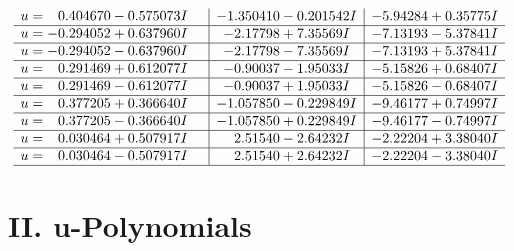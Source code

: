\documentclass[1p]{elsarticle_modified}
\theoremstyle{definition}
\begin{document}
$$\begin{array}{c|c|c}
\begin{aligned}
u &= \phantom{-}0.404670 - 0.575073 I\end{aligned}
 & -1.350410 - 0.201542 I & -5.94284 + 0.35775 I \\ \hline\begin{aligned}
u &= -0.294052 + 0.637960 I\end{aligned}
 & -2.17798 + 7.35569 I & -7.13193 - 5.37841 I \\ \hline\begin{aligned}
u &= -0.294052 - 0.637960 I\end{aligned}
 & -2.17798 - 7.35569 I & -7.13193 + 5.37841 I \\ \hline\begin{aligned}
u &= \phantom{-}0.291469 + 0.612077 I\end{aligned}
 & -0.90037 - 1.95033 I & -5.15826 + 0.68407 I \\ \hline\begin{aligned}
u &= \phantom{-}0.291469 - 0.612077 I\end{aligned}
 & -0.90037 + 1.95033 I & -5.15826 - 0.68407 I \\ \hline\begin{aligned}
u &= \phantom{-}0.377205 + 0.366640 I\end{aligned}
 & -1.057850 - 0.229849 I & -9.46177 + 0.74997 I \\ \hline\begin{aligned}
u &= \phantom{-}0.377205 - 0.366640 I\end{aligned}
 & -1.057850 + 0.229849 I & -9.46177 - 0.74997 I \\ \hline\begin{aligned}
u &= \phantom{-}0.030464 + 0.507917 I\end{aligned}
 & \phantom{-}2.51540 - 2.64232 I & -2.22204 + 3.38040 I \\ \hline\begin{aligned}
u &= \phantom{-}0.030464 - 0.507917 I\end{aligned}
 & \phantom{-}2.51540 + 2.64232 I & -2.22204 - 3.38040 I\\
 \hline 
 \end{array}$$\newpage
\newpage\renewcommand{\arraystretch}{1}
\centering \section*{ II. u-Polynomials}
\end{document}

